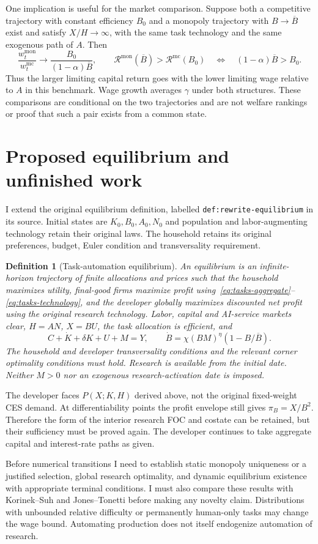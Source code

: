 \documentclass[11pt]{article}
\newtheorem{definition}{Definition}
\begin{document}
One implication is useful for the market comparison. Suppose both a competitive
trajectory with constant efficiency $B_0$ and a monopoly trajectory with
$B\to\overline B$ exist and satisfy $X/H\to\infty$, with the same task
technology and the same exogenous path of $A$. Then
\begin{equation}
 \frac{w_t^{\mathrm{mon}}}{w_t^{\mathrm{mc}}}
 \longrightarrow \frac{B_0}{(1-\alpha)\overline B},\qquad
 \mathcal R^{\mathrm{mon}}(\overline B)>\mathcal R^{\mathrm{mc}}(B_0)
 \quad\Longleftrightarrow\quad (1-\alpha)\overline B>B_0.
 \label{eq:tasks-wage-growth-ranking}
\end{equation}
Thus the larger limiting capital return goes with the lower limiting wage
relative to $A$ in this benchmark. Wage growth averages $\gamma$ under both
structures. These comparisons are conditional on the two trajectories and are
not welfare rankings or proof that such a pair exists from a common state.

\section{Proposed equilibrium and unfinished work}
I extend the original equilibrium definition, labelled
\texttt{def:rewrite-equilibrium} in its source.
Initial states are $K_0,B_0,A_0,N_0$ and population and labor-augmenting
technology retain their original laws. The household retains its original
preferences, budget, Euler condition and transversality requirement.

\begin{definition}[Task-automation equilibrium]
An equilibrium is an infinite-horizon trajectory of finite allocations and
prices such that the household maximizes utility, final-good firms maximize
profit using~\eqref{eq:tasks-aggregate}--\eqref{eq:tasks-technology}, and the
developer globally maximizes discounted net profit using the original research
technology. Labor, capital and AI-service markets clear, $H=AN$, $X=BU$,
the task allocation is efficient, and
\[
 C+\dot K+\delta K+U+M=Y,\qquad
 \dot B=\chi(BM)^\eta(1-B/\overline B).
\]
The household and developer transversality conditions and the relevant
corner optimality conditions must hold. Research is available from the initial
date. Neither $M>0$ nor an exogenous research-activation date is imposed.
\end{definition}

The developer faces $P(X;K,H)$ derived above, not the original fixed-weight
CES demand. At differentiability points the profit envelope still gives
$\pi_B=X/B^2$. Therefore the form of the interior research FOC and costate
can be retained, but their sufficiency must be proved again. The developer
continues to take aggregate capital and interest-rate paths as given.

Before numerical transitions I need to establish static monopoly uniqueness
or a justified selection, global research optimality, and dynamic equilibrium
existence with appropriate terminal conditions. I must also compare these
results with Korinek--Suh and Jones--Tonetti before making any novelty claim.
Distributions with unbounded relative difficulty or permanently human-only
tasks may change the wage bound. Automating production does not itself
endogenize automation of research.
\end{document}
